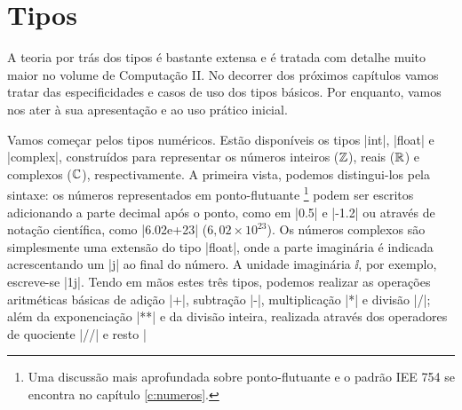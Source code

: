 	\section*{Tipos}%
	A teoria por trás dos tipos é bastante extensa e é tratada com detalhe muito maior no volume de Computação II\cite{xavier:2021}. No decorrer dos próximos capítulos vamos tratar das especificidades e casos de uso dos tipos básicos. Por enquanto, vamos nos ater à sua apresentação e ao uso prático inicial. \par

	Vamos começar pelos tipos numéricos. Estão disponíveis os tipos |int|, |float| e |complex|, construídos para representar os números inteiros ($\mathbb{Z}$), reais ($\mathbb{R}$) e complexos ($\mathbb{C}$), respectivamente. A primeira vista, podemos distingui-los pela sintaxe: os números representados em ponto-flutuante%
	\footnote{Uma discussão mais aprofundada sobre ponto-flutuante e o padrão IEE 754 se encontra no capítulo \ref{c:numeros}.}%
	podem ser escritos adicionando a parte decimal após o ponto, como em |0.5| e |-1.2| ou através de notação científica, como |6.02e+23| ($6,02 \times 10^{23}$). Os números complexos são simplesmente uma extensão do tipo |float|, onde a parte imaginária é indicada acrescentando um |j| ao final do número. A unidade imaginária $\ii$, por exemplo, escreve-se |1j|. Tendo em mãos estes três tipos, podemos realizar as operações aritméticas básicas de adição |+|, subtração |-|, multiplicação |*| e divisão |/|; além da exponenciação |**| e da divisão inteira, realizada através dos operadores de quociente |//| e resto |%

